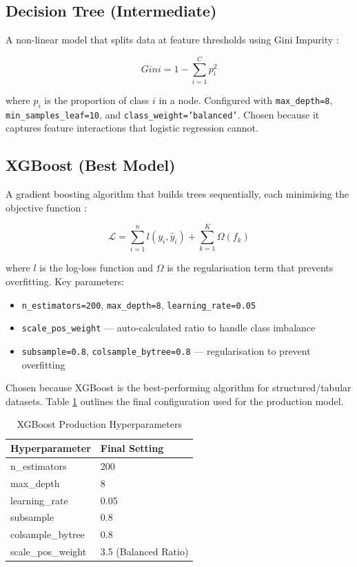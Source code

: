 \documentclass[12pt, a4paper]{article}
\begin{document}
\subsection{Decision Tree (Intermediate)}

A non-linear model that splits data at feature thresholds using Gini Impurity \cite{sklearn}:

\begin{equation}
Gini = 1 - \sum_{i=1}^{C} p_i^2
\end{equation}

where $p_i$ is the proportion of class $i$ in a node. Configured with \texttt{max\_depth=8}, \texttt{min\_samples\_leaf=10}, and \texttt{class\_weight='balanced'}. Chosen because it captures feature interactions that logistic regression cannot.

\subsection{XGBoost (Best Model)}

A gradient boosting algorithm that builds trees sequentially, each minimising the objective function \cite{xgboost}:

\begin{equation}
\mathcal{L} = \sum_{i=1}^{n} l(y_i, \hat{y}_i) + \sum_{k=1}^{K} \Omega(f_k)
\end{equation}

where $l$ is the log-loss function and $\Omega$ is the regularisation term that prevents overfitting. Key parameters:

\begin{itemize}[leftmargin=2cm]
  \item \texttt{n\_estimators=200}, \texttt{max\_depth=8}, \texttt{learning\_rate=0.05}
  \item \texttt{scale\_pos\_weight} --- auto-calculated ratio to handle class imbalance
  \item \texttt{subsample=0.8}, \texttt{colsample\_bytree=0.8} --- regularisation to prevent overfitting
\end{itemize}

Chosen because XGBoost is the best-performing algorithm for structured/tabular datasets. Table \ref{tab:hyperparams} outlines the final configuration used for the production model.

\begin{table}[H]
  \centering
  \caption{XGBoost Production Hyperparameters}
  \label{tab:hyperparams}
  \begin{tabular}{l l}
    \toprule
    \textbf{Hyperparameter} & \textbf{Final Setting} \\
    \midrule
    n\_estimators      & 200 \\
    max\_depth        & 8 \\
    learning\_rate    & 0.05 \\
    subsample        & 0.8 \\
    colsample\_bytree & 0.8 \\
    scale\_pos\_weight & 3.5 (Balanced Ratio) \\
    \bottomrule
  \end{tabular}
\end{table}
\end{document}

